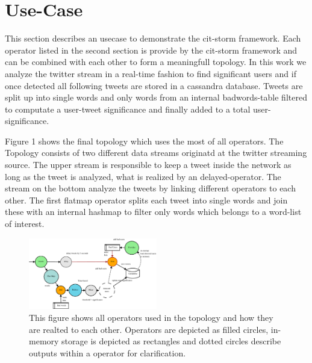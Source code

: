 \section{Use-Case}
\label{sect:useCase}

This section describes an usecase to demonstrate the cit-storm framework. Each operator listed in the second section is provide by the cit-storm framework and can be combined with each other to form a meaningfull topology. In this work we analyze the twitter stream in a real-time fashion to find significant users and if once detected all following tweets are stored in a cassandra database. Tweets are split up into single words and only words from an internal badwords-table filtered to computate a user-tweet significance and finally added to a total user-significance. \newline

Figure 1 shows the final topology which uses the most of all operators. The Topology consists of two different data streams originatd at the twitter streaming source. The upper stream is responsible to keep a tweet inside the network as long as the tweet is analyzed, what is realized by an delayed-operator. The stream on the bottom analyze the tweets by linking different operators to each other. The first flatmap operator splits each tweet into single words and join these with an internal hashmap to filter only words which belongs to a word-list of interest.


\begin{figure}[h]
  \centering
  \includegraphics[width=0.5\textwidth]{images/AnalyzeTweetsTopology}
  \caption{This figure shows all operators used in the topology and how they are realted to each other. Operators are depicted as filled circles, in-memory storage is depicted as rectangles and dotted circles describe outputs within a operator for clarification. }
           
\end{figure}
